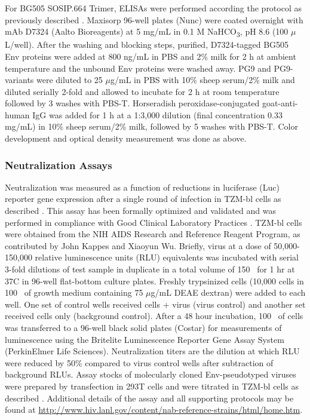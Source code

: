 For BG505 SOSIP.664 Trimer, ELISAs were performed according the protocol as previously described \citep{Sanders:2013gm}. Maxisorp 96-well plates (Nunc) were coated overnight with mAb D7324 (Aalto Bioreagents) at 5 mg/mL in 0.1 M NaHCO\textsubscript{3}, pH 8.6 (100 $\mu$L/well). After the washing and blocking steps, purified, D7324-tagged BG505 Env proteins were added at 800 ng/mL in PBS and 2\% milk for 2 h at ambient temperature and the unbound Env proteins were washed away. PG9 and PG9-variants were diluted to 25 $\mu$g/mL in PBS with 10\% sheep serum/2\% milk and diluted serially 2-fold and allowed to incubate for 2 h at room temperature followed by 3 washes with PBS-T. Horseradish peroxidase-conjugated goat-anti-human IgG was added for 1 h at a 1:3,000 dilution (final concentration 0.33 mg/mL) in 10\% sheep serum/2\% milk, followed by 5 washes with PBS-T. Color development and optical density measurement was done as above.

\subsubsection{Neutralization Assays}
Neutralization was measured as a function of reductions in luciferase (Luc) reporter gene expression after a single round of infection in TZM-bl cells as described \citep{Montefiori:2009hj,Simek:2009cn}. This assay has been formally optimized and validated and was performed in compliance with Good Clinical Laboratory Practices \citep{SarzottiKelsoe:2013hr}. TZM-bl cells were obtained from the NIH AIDS Research and Reference Reagent Program, as contributed by John Kappes and Xiaoyun Wu.  Briefly, virus at a dose of 50,000-150,000 relative luminescence units (RLU) equivalents was incubated with serial 3-fold dilutions of test sample in duplicate in a total volume of 150 \microliter~for 1 hr at 37\degree C in 96-well flat-bottom culture plates.  Freshly trypsinized cells (10,000 cells in 100 \microliter~of growth medium containing 75 $\mu$g/mL DEAE dextran) were added to each well.  One set of control wells received cells + virus (virus control) and another set received cells only (background control). After a 48 hour incubation, 100 \microliter~of cells was transferred to a 96-well black solid plates (Costar) for measurements of luminescence using the Britelite Luminescence Reporter Gene Assay System (PerkinElmer Life Sciences). Neutralization titers are the dilution at which RLU were reduced by 50\% compared to virus control wells after subtraction of background RLUs.  Assay stocks of molecularly cloned Env-pseudotyped viruses were prepared by transfection in 293T cells and were titrated in TZM-bl cells as described \citep{Li:2005go}. Additional details of the assay and all supporting protocols may be found at \url{http://www.hiv.lanl.gov/content/nab-reference-strains/html/home.htm}.


